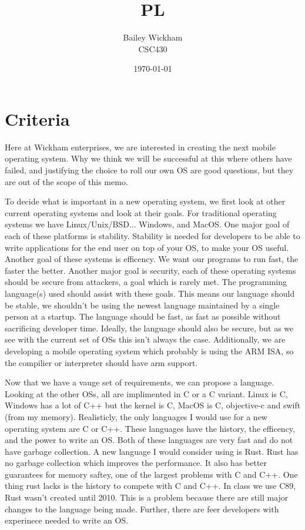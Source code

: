 \documentclass{article}
\title{PL}
\author{Bailey Wickham \\ CSC430}
\date\today
\begin{document}
\maketitle

\section{Criteria}
Here at Wickham enterprises, we are interested in creating the next mobile operating system. Why we think we will be successful at this where others have failed, and justifying the choice to roll our own OS are good questions, but they are out of the scope of this memo.

To decide what is important in a new operating system, we first look at other current operating systems and look at their goals. For traditional operating systems we have Linux/Unix/BSD... Windows, and MacOS. One major goal of each of these platforms is stability. Stability is needed for developers to be able to write applications for the end user on top of your OS, to make your OS useful. Another goal of these systems is efficency. We want our programs to run fast, the faster the better. Another major goal is security, each of these operating systems should be secure from attackers, a goal which is rarely met. The programming language(s) used should assist with these goals. This means our language should be stable, we shouldn't be using the newest language maintained by a single person at a startup. The language should be fast, as fast as possible without sacrificing developer time. Ideally, the language should also be secure, but as we see with the current set of OSs this isn't always the case. Additionally, we are developing a mobile operating system which probably is using the ARM ISA, so the compilier or interpreter should have arm support.

Now that we have a vauge set of requirements, we can propose a language. Looking at the other OSs, all are implimented in C or a C variant. Linux is C, Windows has a lot of C++ but the kernel is C, MacOS is C, objective-c and swift (from my memory). Realisticly, the only languages I would use for a new operating system are C or C++. These languages have the history, the efficency, and the power to write an OS. Both of these languages are very fast and do not have garbage collection. A new language I would consider using is Rust. Rust has no garbage collection which improves the performance. It also has better guarantees for memory saftey, one of the largest problems with C and C++. One thing rust lacks is the history to compete with C and C++. In class we use C89, Rust wasn't created until 2010. This is a problem because there are still major changes to the language being made. Further, there are feer developers with experinece needed to write an OS.
\end{document}
